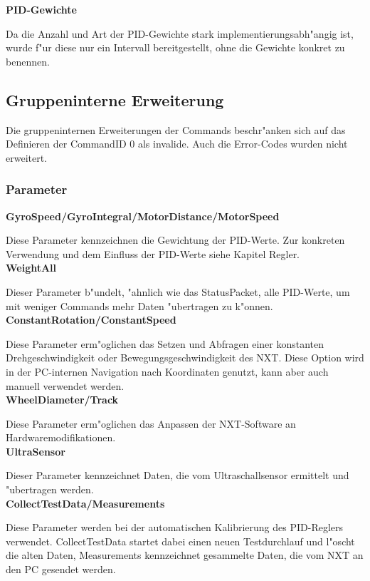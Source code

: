 \documentclass[oneside,abstractoff,a4paper]{scrartcl}
\begin{document}
\noindent\textbf{PID-Gewichte}

Da die Anzahl und Art der PID-Gewichte stark implementierungsabh"angig ist, wurde f"ur diese nur ein Intervall bereitgestellt, ohne die Gewichte konkret zu benennen.

\subsection{Gruppeninterne Erweiterung}
Die gruppeninternen Erweiterungen der Commands beschr"anken sich auf das Definieren der CommandID 0 als invalide. Auch die Error-Codes wurden nicht erweitert.

\subsubsection{Parameter}
\textbf{GyroSpeed/GyroIntegral/MotorDistance/MotorSpeed}

Diese Parameter kennzeichnen die Gewichtung der PID-Werte. Zur konkreten Verwendung und dem Einfluss der PID-Werte siehe Kapitel Regler. \\

\noindent\textbf{WeightAll}

Dieser Parameter b"undelt, "ahnlich wie das StatusPacket, alle PID-Werte, um mit weniger Commands mehr Daten "ubertragen zu k"onnen. \\

\noindent\textbf{ConstantRotation/ConstantSpeed}

Diese Parameter erm"oglichen das Setzen und Abfragen einer konstanten Drehgeschwindigkeit oder Bewegungsgeschwindigkeit des NXT. Diese Option wird in der PC-internen Navigation nach Koordinaten genutzt, kann aber auch manuell verwendet werden. \\

\noindent\textbf{WheelDiameter/Track}

Diese Parameter erm"oglichen das Anpassen der NXT-Software an Hardwaremodifikationen. \\

\noindent\textbf{UltraSensor}

Dieser Parameter kennzeichnet Daten, die vom Ultraschallsensor ermittelt und "ubertragen werden. \\

\noindent\textbf{CollectTestData/Measurements}

Diese Parameter werden bei der automatischen Kalibrierung des PID-Reglers verwendet. CollectTestData startet dabei einen neuen Testdurchlauf und l"oscht die alten Daten, Measurements kennzeichnet gesammelte Daten, die vom NXT an den PC gesendet werden.
\end{document}
